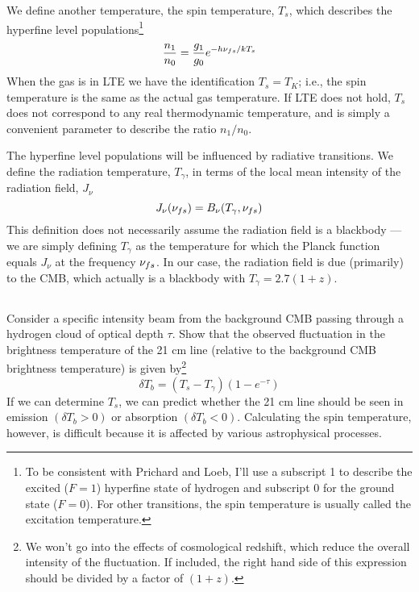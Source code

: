 \documentclass[11pt]{article}
\begin{document}
We define another temperature, the spin temperature, $T_s$, which describes the
hyperfine level populations\footnote{To be consistent with Prichard and Loeb,
I'll use a subscript 1 to describe the excited ($F=1$) hyperfine state of 
hydrogen and subscript 0 for the ground state ($F=0$). For other transitions, the
spin temperature is usually called the excitation temperature.}
\begin{equation}
\frac{n_1}{n_0}=\frac{g_1}{g_0}e^{-h{\nu_{fs}}/kT_s}
\end{equation}
When the gas is in LTE we have the identification $T_s = T_K$; i.e., the spin
temperature is the same as the actual gas temperature. If LTE does not hold, $T_s$
does not correspond to any real thermodynamic temperature, and is simply a
convenient parameter to describe the ratio $n_1/n_0$.

\def\Tg{{T_\gamma}}
The hyperfine level populations will be influenced by radiative transitions. We
define the radiation temperature, $\Tg$, in terms of the local mean intensity of
the radiation field, $J_\nu$
\begin{equation}
J_\nu(\nufs)=B_\nu(\Tg,\nufs)
\end{equation}
This definition does not necessarily assume the radiation field is a blackbody
--- we are simply defining $\Tg$ as the temperature for which the Planck function
equals $J_\nu$ at the frequency ${\nu_{fs}}$. In our case, the radiation field is due
(primarily) to the CMB, which actually is a blackbody with $\Tg=2.7(1+z)$.

\def\dTb{{\delta T_b}}
\subsection{}
Consider a specific intensity beam from the background CMB passing through a
hydrogen cloud of optical depth $\tau$. Show that the observed fluctuation in
the brightness temperature of the 21 cm line (relative to the background CMB
brightness temperature) is given by\footnote{We won't go into the effects of
cosmological redshift, which reduce the overall intensity of the fluctuation.
If included, the right hand side of this expression should be divided by a
factor of $(1 + z)$.}
\begin{equation}
\dTb=(T_s-\Tg)(1-e^{-\tau})
\end{equation}
If we can determine $T_s$, we can predict whether the 21 cm line should be seen
in emission $(\dTb > 0)$ or absorption $(\dTb < 0)$. Calculating the spin
temperature, however, is difficult because it is affected by various
astrophysical processes.
\end{document}
